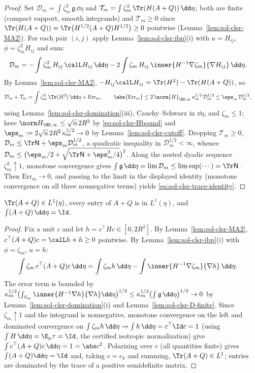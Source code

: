 \documentclass[../main.tex]{subfiles}
\begin{document}
\begin{proof}
Set $\mathcal D_m=\int\zeta_m^2\,\mathfrak g\,\dd\eta$ and
$\mathcal T_m=\int\zeta_m^2\,\Tr(H(A+Q))\,\dd\eta$; both are finite (compact support, smooth
integrands) and $\mathcal T_m\ge0$ since
$\Tr(H(A+Q))=\Tr\bigl(H^{1/2}(A+Q)H^{1/2}\bigr)\ge0$ pointwise
(Lemma~\ref{lem:sol-clsr-MA2}).  For each pair $(i,j)$ apply
Lemma~\ref{lem:sol-clsr-ibp}(i) with $u=H_{ij}$, $\phi=\zeta_m^2H_{ij}$ and sum:
\[
  \mathcal D_m
  =-\int\zeta_m^2\,H_{ij}\,\calL H_{ij}\,\dd\eta
   -2\int\zeta_m\,H_{ij}\,\inner{H^{-1}\nabla\zeta_m}{\nabla H_{ij}}\,\dd\eta .
\]
By Lemma~\ref{lem:sol-clsr-MA2}, $-H_{ij}\calL H_{ij}=\Tr(H^2)-\Tr(H(A+Q))$, so
\[
  \mathcal D_m+\mathcal T_m
  =\int\zeta_m^2\,\Tr(H^2)\,\dd\eta+\mathrm{Err}_m,
  \qquad
  \abs{\mathrm{Err}_m}\le2\,\norm{H}_{\HS,\infty}\,\kappa_m^{1/2}\,\mathcal D_m^{1/2}
  \le\eps_m\,\mathcal D_m^{1/2},
\]
using Lemma~\ref{lem:sol-clsr-domination}(iii), Cauchy--Schwarz in $\dd\eta$, and
$\zeta_m\le1$; here $\norm H_{\HS,\infty}\le\sqrt n\,2R^2$ by \eqref{eq:sol-clsr-Hbound} and
$\eps_m:=2\sqrt n\,2R^2\,\kappa_m^{1/2}\to0$ by Lemma~\ref{lem:sol-clsr-cutoff}.  Dropping
$\mathcal T_m\ge0$,
$\mathcal D_m\le\Tr\mathsf N+\eps_m\mathcal D_m^{1/2}$, a quadratic inequality in
$\mathcal D_m^{1/2}<\infty$, whence
$\mathcal D_m\le\bigl(\eps_m/2+\sqrt{\Tr\mathsf N+\eps_m^2/4}\bigr)^2$.  Along the nested
dyadic sequence $\zeta_m^2\uparrow1$, monotone convergence gives
$\int\mathfrak g\,\dd\eta=\lim\mathcal D_m\le\limsup(\cdots)=\Tr\mathsf N$.  Then
$\mathrm{Err}_m\to0$, and passing to the limit in the displayed identity (monotone convergence
on all three nonnegative terms) yields \eqref{eq:sol-clsr-trace-identity}.
\end{proof}

\begin{lemma}[Normalization]
\label{lem:sol-clsr-normalization}
$\Tr(A+Q)\in L^1(\eta)$, every entry of $A+Q$ is in $L^1(\eta)$, and
$\int(A+Q)\,\dd\eta=\Id$.
\end{lemma}

\begin{proof}
Fix a unit $c$ and let $h=c^\top Hc\in[0,2R^2]$.  By Lemma~\ref{lem:sol-clsr-MA2},
$c^\top(A+Q)c=\calL h+h\ge0$ pointwise.  By Lemma~\ref{lem:sol-clsr-ibp}(i) with $\phi=\zeta_m$,
$u=h$:
\[
  \int\zeta_m\,c^\top(A+Q)c\,\dd\eta
  =\int\zeta_m h\,\dd\eta-\int\inner{H^{-1}\nabla\zeta_m}{\nabla h}\,\dd\eta .
\]
The error term is bounded by
$\kappa_m^{1/2}\bigl(\int_{S_m}\inner{H^{-1}\nabla h}{\nabla h}\dd\eta\bigr)^{1/2}
\le\kappa_m^{1/2}\bigl(\int\mathfrak g\,\dd\eta\bigr)^{1/2}\to0$ by
Lemma~\ref{lem:sol-clsr-domination}(i) and Lemma~\ref{lem:sol-clsr-D-finite}.  Since
$\zeta_m\uparrow1$ and the integrand is nonnegative, monotone convergence on the left and
dominated convergence on $\int\zeta_mh\,\dd\eta\to\int h\,\dd\eta=c^\top\Id c=1$ (using
$\int H\,\dd\eta=\E_\mu\tau=\Id$, the certified isotropic normalization) give
$\int c^\top(A+Q)c\,\dd\eta=1=\abs c^2$.  Polarizing over $c$ (all quantities finite) gives
$\int(A+Q)\dd\eta=\Id$ and, taking $c=e_k$ and summing, $\Tr(A+Q)\in L^1$; entries are
dominated by the trace of a positive semidefinite matrix.
\end{proof}
\end{document}
